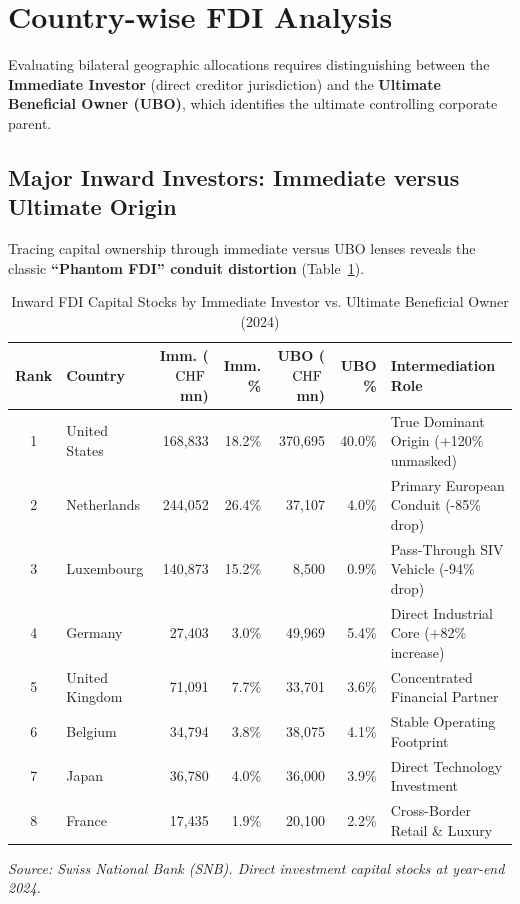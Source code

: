 
\section{Country-wise FDI Analysis}

Evaluating bilateral geographic allocations requires distinguishing between the \textbf{Immediate Investor} (direct creditor jurisdiction) and the \textbf{Ultimate Beneficial Owner (UBO)}, which identifies the ultimate controlling corporate parent.

\subsection{Major Inward Investors: Immediate versus Ultimate Origin}

Tracing capital ownership through immediate versus UBO lenses reveals the classic \textbf{``Phantom FDI'' conduit distortion} (Table~\ref{tab:inward_conduit}).

\begin{table}[H]
\centering
\small
\caption{Inward FDI Capital Stocks by Immediate Investor vs. Ultimate Beneficial Owner (2024)}
\label{tab:inward_conduit}
\setlength{\tabcolsep}{3.2pt}
\renewcommand{\arraystretch}{1.12}
\begin{tabularx}{\textwidth}{c l r r r r >{\raggedright\arraybackslash}X}
\toprule
\rowcolor{tableheadbg}
\textbf{Rank} & \textbf{Country} & \textbf{Imm. ($\text{CHF}$\,mn)} & \textbf{Imm. \%} & \textbf{UBO ($\text{CHF}$\,mn)} & \textbf{UBO \%} & \textbf{Intermediation Role} \\
\midrule
1 & United States & 168,833 & 18.2\% & 370,695 & 40.0\% & True Dominant Origin (+120\% unmasked) \\
\rowcolor{tablerowbg}
2 & Netherlands & 244,052 & 26.4\% & 37,107 & 4.0\% & Primary European Conduit (-85\% drop) \\
3 & Luxembourg & 140,873 & 15.2\% & 8,500 & 0.9\% & Pass-Through SIV Vehicle (-94\% drop) \\
\rowcolor{tablerowbg}
4 & Germany & 27,403 & 3.0\% & 49,969 & 5.4\% & Direct Industrial Core (+82\% increase) \\
5 & United Kingdom & 71,091 & 7.7\% & 33,701 & 3.6\% & Concentrated Financial Partner \\
\rowcolor{tablerowbg}
6 & Belgium & 34,794 & 3.8\% & 38,075 & 4.1\% & Stable Operating Footprint \\
7 & Japan & 36,780 & 4.0\% & 36,000 & 3.9\% & Direct Technology Investment \\
\rowcolor{tablerowbg}
8 & France & 17,435 & 1.9\% & 20,100 & 2.2\% & Cross-Border Retail \& Luxury \\
\bottomrule
\end{tabularx}
\par\vspace{0.3em}
\footnotesize
\textit{Source: Swiss National Bank (SNB). Direct investment capital stocks at year-end 2024.}
\normalsize
\end{table}

